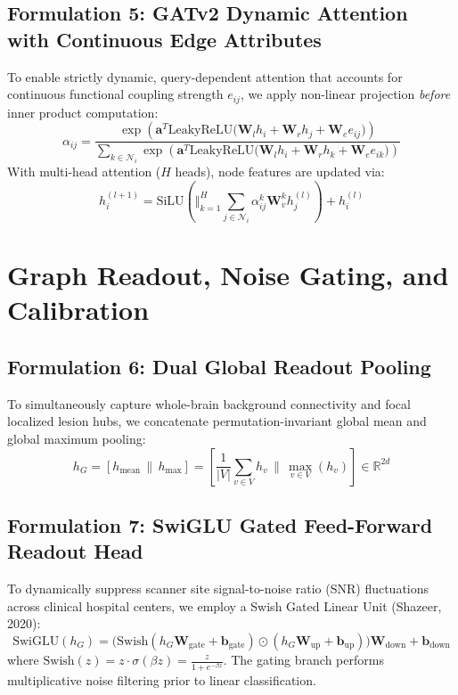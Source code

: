 \documentclass[11pt,a4paper]{article}
\begin{document}
\subsection{Formulation 5: GATv2 Dynamic Attention with Continuous Edge Attributes}
To enable strictly dynamic, query-dependent attention that accounts for continuous functional coupling strength $e_{ij}$, we apply non-linear projection \emph{before} inner product computation:
\begin{equation}
\alpha_{ij} = \frac{\exp\left( \bm{a}^T \text{LeakyReLU}\big( \bm{W}_l h_i + \bm{W}_r h_j + \bm{W}_e e_{ij} \big) \right)}{\sum_{k \in \mathcal{N}_i} \exp\left( \bm{a}^T \text{LeakyReLU}\big( \bm{W}_l h_i + \bm{W}_r h_k + \bm{W}_e e_{ik} \big) \right)}
\end{equation}
With multi-head attention ($H$ heads), node features are updated via:
\begin{equation}
h_i^{(l+1)} = \text{SiLU}\left( \Vert_{k=1}^H \sum_{j \in \mathcal{N}_i} \alpha_{ij}^k \bm{W}_v^k h_j^{(l)} \right) + h_i^{(l)}
\end{equation}

\section{Graph Readout, Noise Gating, and Calibration}

\subsection{Formulation 6: Dual Global Readout Pooling}
To simultaneously capture whole-brain background connectivity and focal localized lesion hubs, we concatenate permutation-invariant global mean and global maximum pooling:
\begin{equation}
h_G = \left[ h_{\text{mean}} \,\|\, h_{\text{max}} \right] = \left[ \frac{1}{|V|} \sum_{v \in V} h_v \, \Bigg\|\, \max_{v \in V}(h_v) \right] \in \mathbb{R}^{2d}
\end{equation}

\subsection{Formulation 7: SwiGLU Gated Feed-Forward Readout Head}
To dynamically suppress scanner site signal-to-noise ratio (SNR) fluctuations across clinical hospital centers, we employ a Swish Gated Linear Unit (Shazeer, 2020):
\begin{equation}
\text{SwiGLU}(h_G) = \Big( \text{Swish}(h_G \bm{W}_{\text{gate}} + \bm{b}_{\text{gate}}) \odot (h_G \bm{W}_{\text{up}} + \bm{b}_{\text{up}}) \Big) \bm{W}_{\text{down}} + \bm{b}_{\text{down}}
\end{equation}
where $\text{Swish}(z) = z \cdot \sigma(\beta z) = \frac{z}{1 + e^{-\beta z}}$. The gating branch performs multiplicative noise filtering prior to linear classification.
\end{document}
